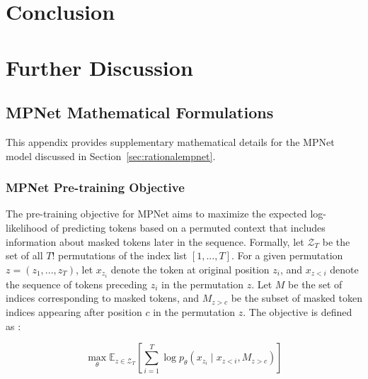 \documentclass[10pt,oneside]{report}
\begin{document}
\chapter{Conclusion}



% 



\appendix
\chapter{Further Discussion}
\section{MPNet Mathematical Formulations} \label{app:mpnet_maths}

This appendix provides supplementary mathematical details for the MPNet model discussed in Section~\ref{sec:rationalempnet}.

\subsection{MPNet Pre-training Objective}

The pre-training objective for MPNet aims to maximize the expected log-likelihood of predicting tokens based on a permuted context that includes information about masked tokens later in the sequence. Formally, let $\mathcal{Z}_{T}$ be the set of all $T!$ permutations of the index list $[1,...,T]$. For a given permutation $z=(z_{1},...,z_{T})$, let $x_{z_{i}}$ denote the token at original position $z_i$, and $x_{z<i}$ denote the sequence of tokens preceding $z_i$ in the permutation $z$. Let $M$ be the set of indices corresponding to masked tokens, and $M_{z>c}$ be the subset of masked token indices appearing after position $c$ in the permutation $z$. The objective is defined as \cite{song2020mpnet}:

\begin{equation} \label{eq:mpnet_objective_appendix}
\max_{\theta} \mathbb{E}_{z\in\mathcal{Z}_{T}} \left[ \sum_{i=1}^{T} \log p_{\theta}(x_{z_{i}} \mid x_{z<i}, M_{z>c}) \right]
\end{equation}
\end{document}
